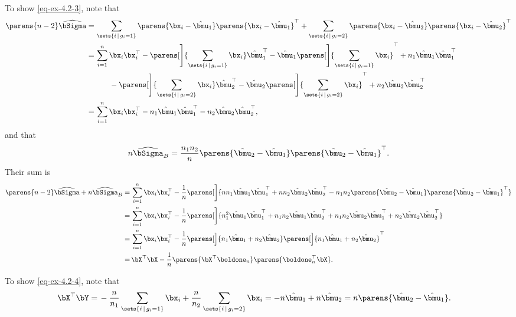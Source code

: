 \documentclass[12pt]{article}
\begin{document}
\begin{enumerate}[label=\textbf{\arabic*.}]
	To show \eqref{eq-ex-4.2-3}, note that 
	\begin{align*}
		\parens{n - 2} \widehat{\bSigma} = & \, \sum_{\sets{i \,\vert\, g_i = 1}} \parens{\bx_i - \hat{\bmu}_1} \parens{\bx_i - \hat{\bmu}_1}^\top + \sum_{\sets{i \,\vert\, g_i = 2}} \parens{\bx_i - \hat{\bmu}_2} \parens{\bx_i - \hat{\bmu}_2}^\top \\ 
		= & \, \sum_{i=1}^n \bx_i \bx_i^\top - \parens[\Bigg]{\sum_{\sets{i \,\vert\, g_i = 1}} \bx_i} \hat{\bmu}_1^\top - \hat{\bmu}_1 \parens[\Bigg]{\sum_{\sets{i \,\vert\, g_i = 1}} \bx_i}^\top + n_1 \hat{\bmu}_1 \hat{\bmu}_1^\top \\ 
		& \qquad - \parens[\Bigg]{\sum_{\sets{i \,\vert\, g_i = 2}} \bx_i} \hat{\bmu}_2^\top - \hat{\bmu}_2 \parens[\Bigg]{\sum_{\sets{i \,\vert\, g_i = 2}} \bx_i}^\top + n_2 \hat{\bmu}_2 \hat{\bmu}_2^\top \\ 
		= & \, \sum_{i=1}^n \bx_i \bx_i^\top - n_1 \hat{\bmu}_1 \hat{\bmu}_1^\top - n_2 \hat{\bmu}_2 \hat{\bmu}_2^\top, 
	\end{align*}
	and that 
	\begin{align*}
		n \widehat{\bSigma}_B = \frac{n_1 n_2}{n} \parens{\hat{\bmu}_2 - \hat{\bmu}_1} \parens{\hat{\bmu}_2 - \hat{\bmu}_1}^\top. 
	\end{align*}
	Their sum is 
	\begin{align*}
		\parens{n - 2} \widehat{\bSigma} + n \widehat{\bSigma}_B = & \, \sum_{i=1}^n \bx_i \bx_i^\top - \frac{1}{n} \parens[\bigg]{n n_1 \hat{\bmu}_1 \hat{\bmu}_1^\top + n n_2 \hat{\bmu}_2 \hat{\bmu}_2^\top - n_1 n_2 \parens{\hat{\bmu}_2 - \hat{\bmu}_1} \parens{\hat{\bmu}_2 - \hat{\bmu}_1}^\top } \\ 
		= & \, \sum_{i=1}^n \bx_i \bx_i^\top - \frac{1}{n} \parens[\bigg]{ n_1^2 \hat{\bmu}_1 \hat{\bmu}_1^\top + n_1 n_2 \hat{\bmu}_1 \hat{\bmu}_2^\top + n_1 n_2 \hat{\bmu}_2 \hat{\bmu}_1^\top + n_2 \hat{\bmu}_2 \hat{\bmu}_2^\top } \\ 
		= & \, \sum_{i=1}^n \bx_i \bx_i^\top - \frac{1}{n} \parens[\Big]{ n_1 \hat{\bmu}_1 + n_2 \hat{\bmu}_2 } \parens[\Big]{ n_1 \hat{\bmu}_1 + n_2 \hat{\bmu}_2 }^\top \\ 
		= & \, \bX^\top \bX - \frac{1}{n} \parens{ \bX^\top \boldone_n } \parens{ \boldone_n^\top \bX }. 
	\end{align*}
	
	To show \eqref{eq-ex-4.2-4}, note that 
	\begin{align*}
		\bX^\top \bY = & \, - \frac{n}{n_1} \sum_{\sets{i \,\vert\, g_i = 1}} \bx_i + \frac{n}{n_2} \sum_{\sets{i \,\vert\, g_i = 2}} \bx_i 
		= -n \hat{\bmu}_1 + n \hat{\bmu}_2 
		= n \parens{\hat{\bmu}_2 - \hat{\bmu}_1}. 
	\end{align*}
	

\end{enumerate}
\end{document}
